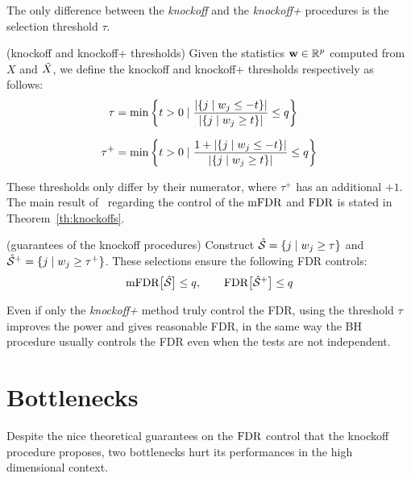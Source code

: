 The only difference between the \emph{knockoff} and the \emph{knockoff+} procedures is the selection threshold $\tau$.
\begin{definition}
    (knockoff and knockoff+ thresholds)
    Given the statistics $\mathbf{w} \in \mathbb{R}^p$ computed from $X$ and $\tilde{X}$,
    we define the knockoff and knockoff+ thresholds respectively as follows:
    \begin{align}
        \tau &=
        \min\left\{
            t > 0 \mid \frac
                { \left\lvert\left\{ j \mid w_j \leq -t \right\}\right\rvert }
                { \left\lvert\left\{ j \mid w_j \geq t \right\}\right\rvert }
            \leq q
        \right\}\label{eq:knock_thres}\\[7pt]
        \tau^+ &=
        \min\left\{
            t > 0 \mid \frac
                { 1 + \left\lvert\left\{ j \mid w_j \leq -t \right\}\right\rvert }
                { \left\lvert\left\{ j \mid w_j \geq t \right\}\right\rvert }
            \leq q
        \right\}\label{eq:knockp_thres}
    \end{align}
\end{definition}
These thresholds only differ by their numerator, where $\tau^+$ has an additional $+1$.
The main result of~\cite{fixed_x_knockoffs, model_x_knockoffs}
regarding the control of the $\text{mFDR}$ and $\text{FDR}$ is stated in Theorem~\ref{th:knockoffs}.
\begin{theorem}\label{th:knockoffs}
    (guarantees of the knockoff procedures)
    Construct $\hat{\mathcal{S}} = \left\{ j \mid w_j \geq \tau \right\}$
    and $\hat{\mathcal{S}}^+ = \left\{ j \mid w_j \geq \tau^+ \right\}$.
    These selections ensure the following FDR controls:
    \begin{equation}
        \text{mFDR}\big[ \hat{\mathcal{S}} \big] \leq q
        ,\qquad
        \text{FDR}\big[ \hat{\mathcal{S}}^+ \big] \leq q
    \end{equation}
\end{theorem}
Even if only the \textit{knockoff+} method truly control the FDR,
using the threshold $\tau$ improves the power and gives reasonable FDR,
in the same way the BH procedure usually controls the FDR even when the tests are not independent.

\section{Bottlenecks}\label{sec:kb}

Despite the nice theoretical guarantees on the $\text{FDR}$ control that the knockoff procedure proposes,
two bottlenecks hurt its performances in the high dimensional context.

